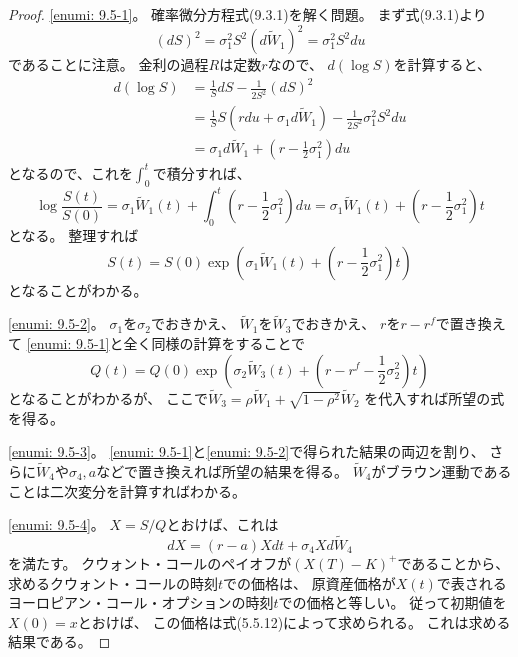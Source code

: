 \documentclass[uplatex]{jsarticle}
\theoremstyle{definition}
\begin{document}
\begin{proof}
  \ref{enumi: 9.5-1}。
  確率微分方程式(9.3.1)を解く問題。
  まず式(9.3.1)より
  \[
  (dS)^2 = \sigma_1^2S^2 \left( d\tilde{W}_1 \right)^2 = \sigma_1^2S^2du
  \]
  であることに注意。
  金利の過程\(R\)は定数\(r\)なので、
  \(d\left(\log S\right)\)を計算すると、
  \begin{align*}
    d\left(\log S\right)
    &= \frac{1}{S}dS - \frac{1}{2S^2}(dS)^2 \\
    &= \frac{1}{S}S\left( rdu + \sigma_1d\tilde{W}_1\right)
    - \frac{1}{2S^2}\sigma_1^2S^2du \\
    &= \sigma_1d\tilde{W}_1 + \left( r - \frac{1}{2}\sigma_1^2 \right) du
  \end{align*}
  となるので、これを\(\int_0^t\)で積分すれば、
  \[
  \log\frac{S(t)}{S(0)}
  = \sigma_1\tilde{W}_1(t)
  + \int_0^t\left( r-\frac{1}{2}\sigma_1^2 \right) du
  = \sigma_1\tilde{W}_1(t)
  + \left( r-\frac{1}{2}\sigma_1^2 \right) t
  \]
  となる。
  整理すれば
  \[
  S(t) = S(0)\exp\left( \sigma_1\tilde{W}_1(t)
  + \left( r-\frac{1}{2}\sigma_1^2 \right) t\right)
  \]
  となることがわかる。

  \ref{enumi: 9.5-2}。
  \(\sigma_1\)を\(\sigma_2\)でおきかえ、
  \(\tilde{W}_1\)を\(\tilde{W}_3\)でおきかえ、
  \(r\)を\(r-r^f\)で置き換えて
  \ref{enumi: 9.5-1}と全く同様の計算をすることで
  \[
  Q(t) = Q(0)\exp\left( \sigma_2\tilde{W}_3(t)
  + \left( r-r^f-\frac{1}{2}\sigma_2^2 \right) t\right)
  \]
  となることがわかるが、
  ここで\(\tilde{W}_3 = \rho\tilde{W}_1 + \sqrt{1-\rho^2}\tilde{W}_2\)
  を代入すれば所望の式を得る。

  \ref{enumi: 9.5-3}。
  \ref{enumi: 9.5-1}と\ref{enumi: 9.5-2}で得られた結果の両辺を割り、
  さらに\(\tilde{W}_4\)や\(\sigma_4,a\)などで置き換えれば所望の結果を得る。
  \(\tilde{W}_4\)がブラウン運動であることは二次変分を計算すればわかる。

  \ref{enumi: 9.5-4}。
  \(X = S/Q\)とおけば、これは
  \[
  dX = (r-a)Xdt + \sigma_4Xd\tilde{W}_4
  \]
  を満たす。
  クウォント・コールのペイオフが\((X(T)-K)^+\)であることから、
  求めるクウォント・コールの時刻\(t\)での価格は、
  原資産価格が\(X(t)\)で表される
  ヨーロピアン・コール・オプションの時刻\(t\)での価格と等しい。
  従って初期値を\(X(0)=x\)とおけば、
  この価格は式(5.5.12)によって求められる。
  これは求める結果である。
\end{proof}
\end{document}
